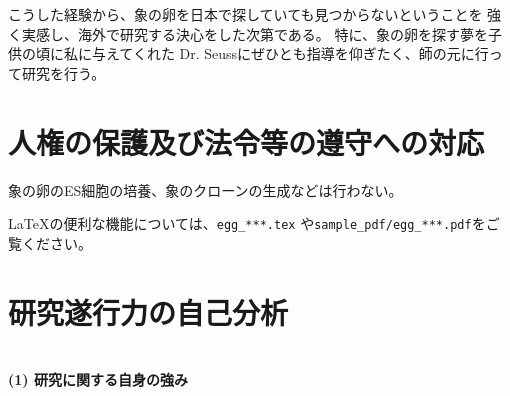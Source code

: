 \documentclass[11pt,a4j,dvipdfmx]{jarticle} 					%
\newcommand{\研究課題名}{象の卵}
\newcommand{\研究機関名}{逢坂大学}
\newcommand{\研究代表者氏名}{湯川秀樹}
\begin{document}
	こうした経験から、象の卵を日本で探していても見つからないということを
	強く実感し、海外で研究する決心をした次第である。
	特に、象の卵を探す夢を子供の頃に私に与えてくれた
	Dr. Seussにぜひとも指導を仰ぎたく、師の元に行って研究を行う。




\section{人権の保護及び法令等の遵守への対応}

	象の卵のES細胞の培養、象のクローンの生成などは行わない。

	\LaTeX の便利な機能については、\texttt{egg\_***.tex} や\texttt{sample\_pdf/egg\_***.pdf}をご覧ください。




\section{研究遂行力の自己分析}

\DCPDInstructionsA\\%
\noindent
\textbf{(1) 研究に関する自身の強み}
\DCPDInstructionsB%
\end{document}
